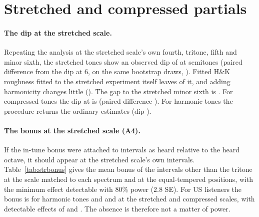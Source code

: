\documentclass[11pt,a4paper]{article}
\newcommand{\HK}{H\&K}
\begin{document}
\begin{table}[h]
\centering
\caption{The step (M2) under other analysis choices (exploratory): plain mean over the six
harmonic spectra [participant-bootstrap CI] of the step as an indicator and as an increment,
the bonus and baseline parts of the gap, and the step per spectrum (point estimates). Guitar
and piano use proxy spectra. Bold: CI excludes zero.}
\label{tab:step}
\scriptsize
\setlength{\tabcolsep}{2pt}
\end{table}

\section{Stretched and compressed partials}
\label{sec:stretched}

\paragraph{The dip at the stretched scale.}
Repeating the analysis at the stretched scale's own fourth, tritone, fifth and minor sixth,
the stretched tones show an observed dip of \sscObsDipStr{} at \sscPosStr{} semitones (paired
difference from the dip at 6, on the same bootstrap draws, \sscObsDipStrDiff). Fitted \HK{}
roughness fitted to the stretched experiment itself leaves \sscHKDipStr{} of it, and adding
harmonicity changes little (\sscHKHDipStr). The gap to the stretched minor sixth is
\sscObsGapStr. For compressed tones the dip at \sscPosComp{} is \sscObsDipComp{} (paired
difference \sscObsDipCompDiff). For harmonic tones the procedure returns the ordinary
estimates (dip \sscObsDipHarm).

\paragraph{The bonus at the stretched scale (A4).}
If the in-tune bonus were attached to intervals as heard relative to the heard octave, it
should appear at the stretched scale's own intervals. Table~\ref{tab:strbonus} gives the mean
bonus of the intervals other than the tritone at the scale matched to each spectrum and at the
equal-tempered positions, with the minimum effect detectable with 80\% power (2.8 SE). For US
listeners the bonus is \sbOwnHarm{} for harmonic tones and \sbOwnStr{} and \sbOwnComp{} at the
stretched and compressed scales, with detectable effects of \sbMdeStr{} and \sbMdeComp. The
absence is therefore not a matter of power.
\end{document}
